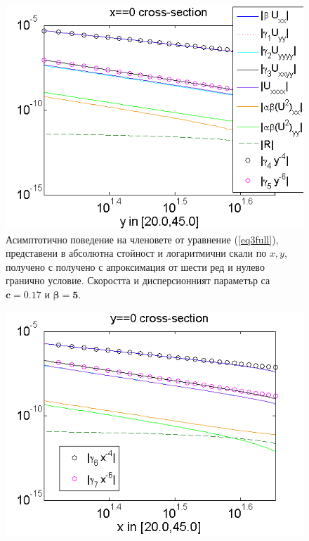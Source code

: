 \documentclass[a4paper]{article}
\newcommand{\rf}[1]{(\ref{#1})}
\theoremstyle{remark}
\begin{document}
\begin{large}
\begin{figure}[ht]
\begin{minipage}[b]{0.95\linewidth}
	\end{minipage}
	\begin{minipage}[b]{0.95\linewidth}
		 \raggedright
		\includegraphics[width=\linewidth]{AssymptForEachTerm/c017_bt1_5/ChristovIC_AlongY_50_ZB2_bt5_c017_h020_O(h^6).png}
	\end{minipage}
	\caption{Асимптотично поведение на членовете от уравнение \rf{eq3full}, представени в абсолютна стойност и логаритмични скали по $x,y$, получено с получено с апроксимация от шести ред и нулево гранично условие. Скоростта и дисперсионният параметър са $\boldsymbol{c=0.17}$ и $\boldsymbol{\beta = 5}$.}
	\label{fig:assympt_c017bt5}
\end{figure}
\FloatBarrier
\begin{figure}[ht]
	\begin{minipage}[b]{0.95\linewidth}
		\raggedleft
		\includegraphics[width=\linewidth]{AssymptForEachTerm/bt1_c010_090/ChristovIC_AlongX_50_ZB2_bt1_c010_h020_O(h^6).png}

\end{minipage}
\end{figure}
\end{large}
\end{document}

